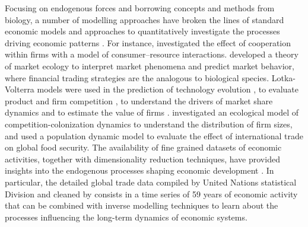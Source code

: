   Focusing on endogenous forces and borrowing concepts and methods from biology, a number of modelling approaches have broken the lines of standard economic models and approaches to quantitatively investigate the processes driving economic patterns \citep{Tacchella2018}.
  For instance, \citep{Saavedra2009a} investigated the effect of cooperation within firms with a model of consumer–resource interactions. \citep{Scholl2020} developed a theory of market ecology to interpret market phenomena and predict market behavior, where financial trading strategies are the analogous to biological species.
  Lotka-Volterra models were used in the prediction of technology evolution \citep{Zhang2018}, to evaluate product and firm competition \citep{Modis1997,Saavedra2014}, to understand the drivers of market share dynamics \citep{Farmer1999,Michalakelis2011,Marasco2016,Gatabazi2019} and to estimate the value of firms \citep{Cauwels56}.
  \citep{Applegate2021} investigated an ecological model of competition-colonization dynamics to understand the distribution of firm sizes, and \citep{Suweis2015} used a population dynamic model to evaluate the effect of international trade on global food security.
  The availability of fine grained datasets of economic activities, together with dimensionality reduction techniques, have provided insights into the endogenous processes shaping economic development \citep{Mealy2019,Hidalgo2021}.
  In particular, the detailed global trade data compiled by United Nations statistical Division and cleaned by \citep{Hidalgo2021} consists in a time series of 59 years of economic activity that can be combined with inverse modelling techniques to learn about the processes influencing the long-term dynamics of economic systems.
  
